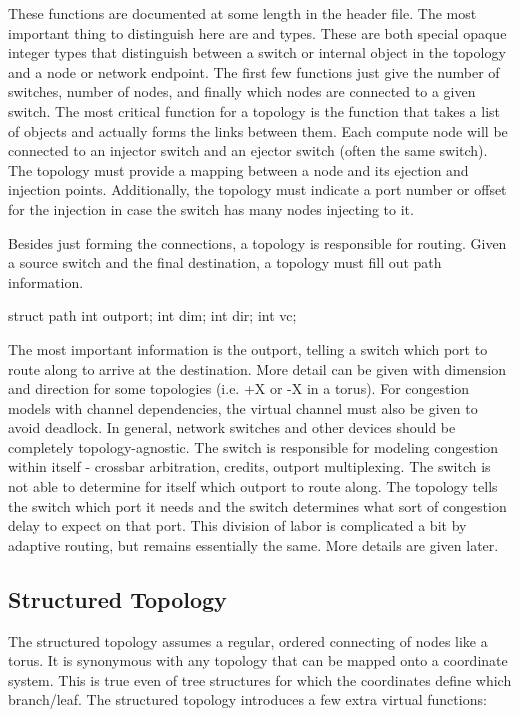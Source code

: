 These functions are documented at some length in the  header file.
The most important thing to distinguish here are \nodeid and \switchid types.
These are both special opaque integer types that distinguish between a switch or internal object in the topology and a node or network endpoint.
The first few functions just give the number of switches, number of nodes, and finally which nodes are connected to a given switch.
The most critical function for a topology is the  function that takes a list of objects and actually forms the links between them.
Each compute node will be connected to an injector switch and an ejector switch (often the same switch).
The topology must provide a mapping between a node and its ejection and injection points.
Additionally, the topology must indicate a port number or offset for the injection in case the switch has many nodes injecting to it.

Besides just forming the connections, a topology is responsible for routing.
Given a source switch and the final destination, a topology must fill out path information.

\begin{CppCode}
struct path {
  int outport;
  int dim;
  int dir;
  int vc;
}
\end{CppCode}

The most important information is the outport, telling a switch which port to route along to arrive at the destination.
More detail can be given with dimension and direction for some topologies (i.e. +X or -X in a torus).
For congestion models with channel dependencies, the virtual channel must also be given to avoid deadlock.
In general, network switches and other devices should be completely topology-agnostic.
The switch is responsible for modeling congestion within itself - crossbar arbitration, credits, outport multiplexing.
The switch is not able to determine for itself which outport to route along.
The topology tells the switch which port it needs and the switch determines what sort of congestion delay to expect on that port.
This division of labor is complicated a bit by adaptive routing, but remains essentially the same.  More details are given later.

\subsection{Structured Topology}\label{subsec:structuredTopology}

The structured topology assumes a regular, ordered connecting of nodes like a torus.
It is synonymous with any topology that can be mapped onto a coordinate system.
This is true even of tree structures for which the coordinates define which branch/leaf.
The structured topology introduces a few extra virtual functions:

